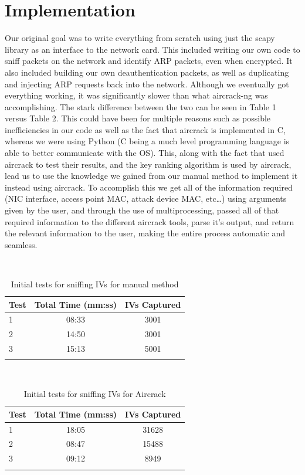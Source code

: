 \documentclass[10pt, titlepage]{article}
\begin{document}
\section{Implementation}
Our original goal was to write everything from scratch using just the scapy library as an interface to the network card. This included writing our own code to sniff packets on the network and identify ARP packets, even when encrypted. It also included building our own deauthentication packets, as well as duplicating and injecting ARP requests back into the network. Although we eventually got everything working, it was significantly slower than what aircrack-ng was accomplishing. The stark difference between the two can be seen in Table 1 versus Table 2. This could have been for multiple reasons such as possible inefficiencies in our code as well as the fact that aircrack is implemented in C, whereas we were using Python (C being a much level programming language is able to better communicate with the OS). This, along with the fact that \cite{mainPaper} used aircrack to test their results, and the key ranking algorithm is used by aircrack, lead us to use the knowledge we gained from our manual method to implement it instead using aircrack. To accomplish this we get all of the information required (NIC interface, access point MAC, attack device MAC, etc…) using arguments given by the user, and through the use of multiprocessing, passed all of that required information to the different aircrack tools, parse it’s output, and return the relevant information to the user, making the entire process automatic and seamless.\\

\begin{table}[H]
	\centering
	\caption{Initial tests for sniffing IVs for manual method}~\\
	\begin{tabular}{lcc}
		Test	& Total Time (mm:ss)	& IVs Captured \\
		\hline
		1		& 	08:33						& 3001 \\
		2		& 	14:50						& 3001 \\
		3		& 	15:13						& 5001 \\		
		\hline \\
	\end{tabular}
\end{table}

\begin{table}[H]
	\centering
	\caption{Initial tests for sniffing IVs for Aircrack}~\\
	\begin{tabular}{lcc}
		Test	& Total Time (mm:ss)	& IVs Captured \\
		\hline
		1		& 	18:05						& 31628 \\
		2		& 	08:47						& 15488 \\
		3		& 	09:12						& 8949 \\		
		\hline \\
	\end{tabular}
\end{table}
\end{document}

